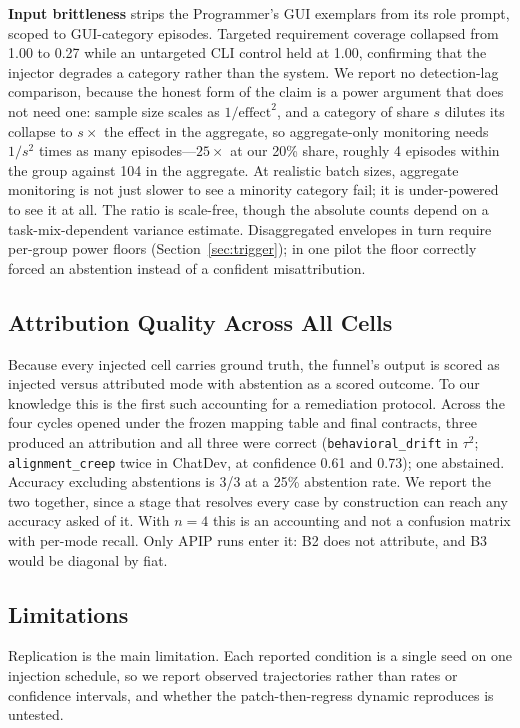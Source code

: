 \documentclass[conference]{IEEEtran}
\newcommand{\code}[1]{\texttt{\small #1}}
\begin{document}
\textbf{Input brittleness} strips the Programmer's GUI exemplars from its role
prompt, scoped to GUI-category episodes. Targeted requirement coverage
collapsed from 1.00 to 0.27 while an untargeted CLI control held at 1.00,
confirming that the injector degrades a category rather than the system. We
report no detection-lag comparison, because the honest form of the claim is a
power argument that does not need one: sample size scales as
$1/\text{effect}^2$, and a category of share $s$ dilutes its collapse to
$s\times$ the effect in the aggregate, so aggregate-only monitoring needs
$1/s^2$ times as many episodes---$25\times$ at our 20\% share, roughly 4
episodes within the group against 104 in the aggregate.
At realistic batch sizes, aggregate monitoring is not just slower to see a
minority category fail; it is under-powered to see it at all. The ratio is
scale-free, though the absolute counts depend on a task-mix-dependent variance
estimate. Disaggregated envelopes in turn require per-group power floors
(Section~\ref{sec:trigger}); in one pilot the floor correctly forced an
abstention instead of a confident misattribution.

\subsection{Attribution Quality Across All Cells}
\label{sec:attrquality}

Because every injected cell carries ground truth, the funnel's output is scored
as injected versus attributed mode with abstention as a scored outcome. To our
knowledge this is the first such accounting for a remediation protocol. Across
the four cycles opened under the frozen mapping table and final contracts,
three produced an attribution and all three were correct
(\code{behavioral\_drift} in $\tau^2$; \code{alignment\_creep} twice in
ChatDev, at confidence 0.61 and 0.73); one abstained. Accuracy excluding
abstentions is 3/3 at a 25\% abstention rate. We report the two together, since
a stage that resolves every case by construction can reach any accuracy asked
of it. With $n=4$ this is an accounting and not a confusion matrix with
per-mode recall. Only APIP runs enter it: B2 does not attribute, and B3 would
be diagonal by fiat.

\subsection{Limitations}
\label{sec:limitations}

Replication is the main limitation. Each reported condition is a single seed on
one injection schedule, so we report observed trajectories rather than rates or
confidence intervals, and whether the patch-then-regress dynamic reproduces is
untested.
\end{document}
